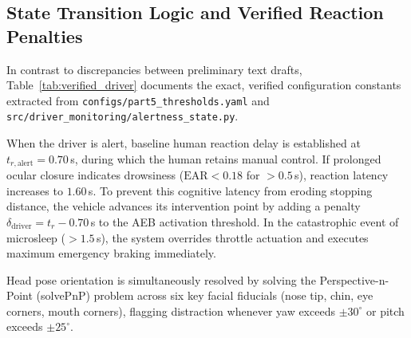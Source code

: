 \documentclass[3p,twocolumn]{elsarticle}
\begin{document}
\subsection{State Transition Logic and Verified Reaction Penalties}
In contrast to discrepancies between preliminary text drafts, Table~\ref{tab:verified_driver} documents the exact, verified configuration constants extracted from \texttt{configs/part5\_thresholds.yaml} and \texttt{src/driver\_monitoring/alertness\_state.py}.

\begin{table}[!t]
\caption{Verified Driver State Classification and Reaction Time Penalties}
\label{tab:verified_driver}
\centering
\small
{}%
\end{table}

When the driver is alert, baseline human reaction delay is established at $t_{r,\text{alert}} = 0.70$\,s, during which the human retains manual control. If prolonged ocular closure indicates drowsiness ($\text{EAR} < 0.18$ for $>0.5$\,s), reaction latency increases to $1.60$\,s. To prevent this cognitive latency from eroding stopping distance, the vehicle advances its intervention point by adding a penalty $\delta_{\text{driver}} = t_r - 0.70$\,s to the AEB activation threshold. In the catastrophic event of microsleep ($>1.5$\,s), the system overrides throttle actuation and executes maximum emergency braking immediately.

Head pose orientation is simultaneously resolved by solving the Perspective-n-Point (solvePnP) problem across six key facial fiducials (nose tip, chin, eye corners, mouth corners), flagging distraction whenever yaw exceeds $\pm 30^\circ$ or pitch exceeds $\pm 25^\circ$.
\end{document}
